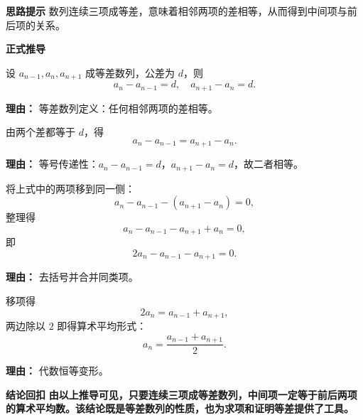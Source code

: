 \begin{proofbox}
	\textbf{\textcolor{CProof}{思路提示}}
	数列连续三项成等差，意味着相邻两项的差相等，从而得到中间项与前后项的关系。

	\medskip
	\textbf{\textcolor{CProof}{正式推导}}
	\begin{description}[style=nextline, leftmargin=2.8em, labelsep=0.5em, itemsep=0.55em]
		\item[\textbf{步骤一（设公差）：}]
			设 $a_{n-1},a_n,a_{n+1}$ 成等差数列，公差为 $d$，则
			\[
				a_n - a_{n-1} = d,\quad a_{n+1} - a_n = d.
			\]
			\par\textbf{理由：} 等差数列定义：任何相邻两项的差相等。
		\item[\textbf{步骤二（等量传递）：}]
			由两个差都等于 $d$，得
			\[
				a_n - a_{n-1} = a_{n+1} - a_n.
			\]
			\par\textbf{理由：} 等号传递性：$a_n-a_{n-1}=d$，$a_{n+1}-a_n=d$，故二者相等。
		\item[\textbf{步骤三（移项合并）：}]
			将上式中的两项移到同一侧：
			\[
				a_n - a_{n-1} - (a_{n+1} - a_n) = 0,
			\]
			整理得
			\[
				a_n - a_{n-1} - a_{n+1} + a_n = 0,
			\]
			即
			\[
				2a_n - a_{n-1} - a_{n+1} = 0.
			\]
			\par\textbf{理由：} 去括号并合并同类项。
		\item[\textbf{步骤四（最终变形）：}]
			移项得
			\[
				2a_n = a_{n-1} + a_{n+1},
			\]
			两边除以 $2$ 即得算术平均形式：
			\[
				a_n = \frac{a_{n-1}+a_{n+1}}{2}.
			\]
			\par\textbf{理由：} 代数恒等变形。
	\end{description}

	\medskip
	\textbf{\textcolor{CProof}{结论回扣}}
	\textbf{由以上推导可见，只要连续三项成等差数列，中间项一定等于前后两项的算术平均数。该结论既是等差数列的性质，也为求项和证明等差提供了工具。}
\end{proofbox}
